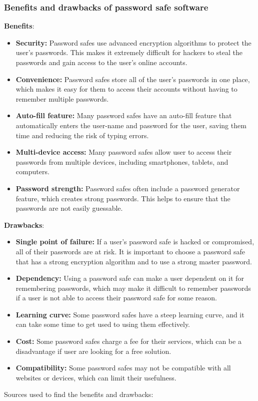 \documentclass[conference]{IEEEtran}
\begin{document}
\subsubsection{Benefits and drawbacks of password safe software}
\textbf{Benefits}:
\begin{itemize}
\item \textbf{Security:} Password safes use advanced encryption algorithms to protect the user's passwords. This makes it extremely difficult for hackers to steal the passwords and gain access to the user's online accounts.
\item \textbf{Convenience:} Password safes store all of the user's passwords in one place, which makes it easy for them to access their accounts without having to remember multiple passwords.
\item \textbf{Auto-fill feature:} Many password safes have an auto-fill feature that automatically enters the user-name and password for the user, saving them time and reducing the risk of typing errors.
\item \textbf{Multi-device access:} Many password safes allow user to access their passwords from multiple devices, including smartphones, tablets, and computers.
\item \textbf{Password strength:} Password safes often include a password generator feature, which creates strong passwords. This helps to ensure that the passwords are not easily guessable.
\end{itemize}
\textbf{Drawbacks}:
\begin{itemize}
\item \textbf{Single point of failure:} If a user's password safe is hacked or compromised, all of their passwords are at risk. It is important to choose a password safe that has a strong encryption algorithm and to use a strong master password.
\item \textbf{Dependency:} Using a password safe can make a user dependent on it for remembering passwords, which may make it difficult to remember passwords if a user is not able to access their password safe for some reason.
\item \textbf{Learning curve:} Some password safes have a steep learning curve, and it can take some time to get used to using them effectively.
\item \textbf{Cost:} Some password safes charge a fee for their services, which can be a disadvantage if user are looking for a free solution.
\item \textbf{Compatibility:} Some password safes may not be compatible with all websites or devices, which can limit their usefulness.
\end{itemize}
Sources used to find the benefits and drawbacks: \cite{b8}
\end{document}
